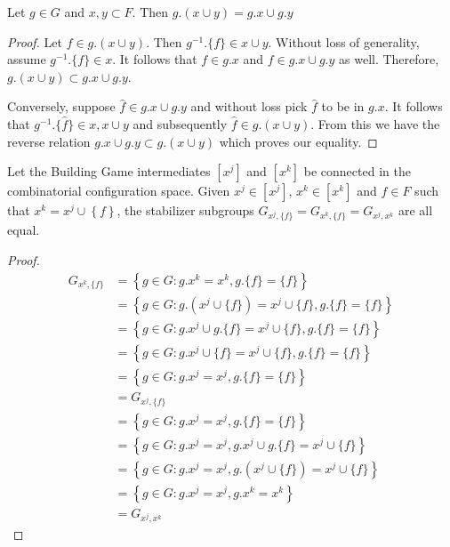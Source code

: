 \begin{mylem}
Let $g \in G$ and $x,y \subset F$. Then $g.(x\cup y) = g.x \cup g.y$
\end{mylem}
\begin{proof}
Let $f \in g.(x\cup y)$. Then $g^{-1}.\{f\} \in x \cup y$. Without loss of generality, assume $g^{-1}.\{f\} \in x$. It follows that $f \in g.x$ and $f \in g.x \cup g.y$ as well. Therefore, $g.(x\cup y) \subset g.x \cup g.y$.

Conversely, suppose $\hat{f} \in g.x \cup g.y$ and without loss pick $\hat{f}$ to be in $g.x$. It follows that $g^{-1}.\{\hat{f}\} \in x, x \cup y$ and subsequently $\hat{f} \in g.(x \cup y)$. From this we have the reverse relation $g.x \cup g.y \subset g.(x\cup y)$ which proves our equality.
\end{proof}


\begin{mylem}
\label{lem:I}
Let the Building Game intermediates $[x^j]$ and $[x^k]$ be connected in the combinatorial configuration space. Given $x^j \in [x^j]$, $x^k \in [x^k]$ and $f \in F$ such that $x^k = x^j \cup \left\{f\right\}$, the stabilizer subgroups $G_{x^j,\{f\}} = G_{x^k,\{f\}} = G_{x^j,x^k}$ are all equal.
\end{mylem}
\begin{proof}
\begin{align}
G_{x^k,\{f\}} &= \left\{g \in G : g.x^k = x^k, g.\{f\} = \{f\} \right\} \\
           &= \left\{g \in G : g.(x^j \cup \{f\}) = x^j \cup \{f\}, g.\{f\} = \{f\} \right\} \\
           &= \left\{g \in G : g.x^j \cup g.\{f\} = x^j \cup \{f\}, g.\{f\} = \{f\} \right\} \\
           &= \left\{g \in G : g.x^j \cup \{f\} = x^j \cup \{f\}, g.\{f\} = \{f\} \right\} \\
           &= \left\{g \in G : g.x^j  = x^j, g.\{f\} = \{f\} \right\} \\
           &= G_{x^j,\{f\}} \\
&= \left\{g \in G : g.x^j  = x^j, g.\{f\} = \{f\} \right\} \\           
&= \left\{g \in G : g.x^j  = x^j, g.x^j \cup g.\{f\} = x^j \cup \{f\} \right\} \\     
&= \left\{g \in G : g.x^j  = x^j, g.(x^j \cup \{f\}) = x^j \cup \{f\} \right\} \\ 
&= \left\{g \in G : g.x^j  = x^j, g.x^k = x^k \right\} \\ 
&= G_{x^j,x^k}
\end{align}
\end{proof}



